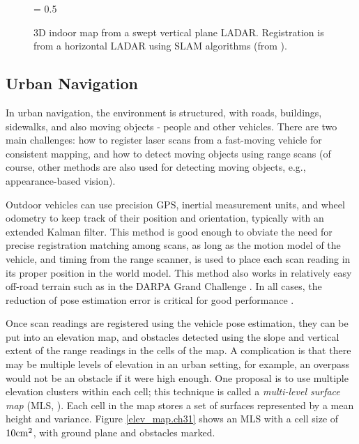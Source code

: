 \documentclass[twocolumn,oneside]{book}
\begin{document}
\begin{figure}[hbt]
{\epsfxsize = 0.5\textwidth {}}
\caption{3D indoor map from a swept vertical plane LADAR.
Registration is from a horizontal LADAR using SLAM algorithms (from
\cite{thrun00}). 
\label{indoor_3d_map.ch31}}
\end{figure}



\subsection{Urban Navigation}

In urban navigation, the environment is structured, with roads,
buildings, sidewalks, and also moving objects - people and other
vehicles.  There are two main challenges: how to register laser scans
from a fast-moving vehicle for consistent mapping, and how to detect
moving objects using range scans (of course, other methods are also
used for detecting moving objects, e.g., appearance-based vision).

Outdoor vehicles can use precision GPS, inertial measurement units,
and wheel odometry to keep track of their position and orientation,
typically with an extended Kalman filter.  This method is good enough
to obviate the need for precise registration matching among scans, as
long as the motion model of the vehicle, and timing from the range
scanner, is used to place each scan reading in its proper position in
the world model.  This method also works in relatively easy off-road
terrain such as in the DARPA Grand Challenge
\cite{GrandChallenge}.  In all cases, the reduction of pose
estimation error is critical for good performance
\cite{thrun06}. 

Once scan readings are registered using the vehicle pose estimation,
they can be put into an elevation map, and obstacles detected using
the slope and vertical extent of the range readings in the cells of
the map.  A complication is that there may be multiple levels of
elevation in an urban setting, for example, an overpass would not be
an obstacle if it were high enough.  One proposal is to use multiple
elevation clusters within each cell; this technique is called a {\em
multi-level surface map } (MLS, \cite{triebel06}).
Each cell in the map stores a set of surfaces represented by a mean
height and variance.  Figure \ref{elev_map.ch31} shows an MLS with a
cell size of $10 {\rm cm}^2$, with ground plane and obstacles marked.
\end{document}
